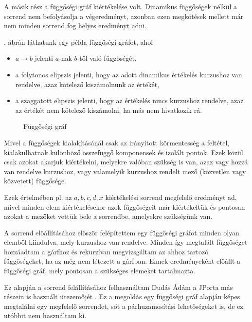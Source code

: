 A másik rész a függőségi gráf kiértékelése volt. Dinamikus függőségek nélkül a sorrend nem befolyásolja a végeredményt, azonban ezen megkötések mellett már nem minden sorrend fog helyes eredményt adni. 

. ábrán láthatunk egy példa függőségi gráfot, ahol 
\begin{itemize}
    \item $a \rightarrow b$ jelenti $a$-nak $b$-től való függőségét,
    \item a folytonos elipszis jelenti, hogy az adott dinamikus értékelés kurzushoz van rendelve, azaz kötelező kiszámolnunk az értékét,
    \item a szaggatott elipszis jelenti, hogy az értékelés nincs kurzushoz rendelve, azaz az értékét nem kötelező kiszámolni, ha más nem hivatkozik rá.
\end{itemize}

\begin{figure}[h]
    \centering
    \caption{Függőségi gráf}
    \label{fig:dependency_graph}
\end{figure}

Mivel a függőségek kialakításánál csak az irányított körmentesség a feltétel, kialakulhatnak különböző összefüggő komponensek és izolált pontok. Ezek közül csak azokat akarjuk kiértékelni, melyekre valóban szükség is van, azaz vagy hozzá van rendelve kurzushoz, vagy valamelyik kurzushoz rendelt mező (közvetlen vagy közvetett) függősége.

Ezek értelmében pl. az $a, b, c, d, x$ kiértékelési sorrend megfelelő eredményt ad, mivel minden elem kiértékelésekor azok függőségeit már kiértékeltük és pontosan azokat a mezőket vettük bele a sorrendbe, amelyekre szükségünk van.

A sorrend előállításához először felépítettem egy függőségi gráfot minden olyan elemből kiindulva, mely kurzushoz van rendelve. Minden így megtalált függőséget hozzáadtam a gárfhoz és rekurzívan megvizsgáltam az ahhoz tartozó függőségeket, ha az még nem létezett a gárfban. Ennek eredményeként előállt a függőségi gráf, mely pontosan a szükséges elemeket tartalmazta.

Ez alapján a sorrend felállításához felhasználtam Dudás Ádám a JPorta más részein is használt ütezemőjét \cite{DudiMsc}. Ez a megoldás egy függőségi gráf alapján képes megtalálni egy megfelelő sorrendet, sőt a párhuzamosítási lehetőségeket is, de ez utóbbit nem használtam ki.

